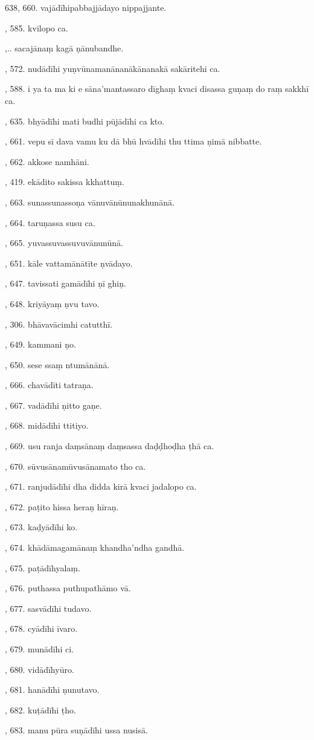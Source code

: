 638, 660. vajādīhipabbajjādayo nippajjante.\par {}, 585. kvilopo ca.\par {},.. sacajānaṃ kagā ṇānubandhe.\par {}, 572. nudādīhi yuṇvūnamanānanākānanakā sakāritehi ca.\par {}, 588. i ya ta ma ki e sāna’mantassaro dīghaṃ kvaci disassa guṇaṃ do raṃ sakkhī ca.\par {}, 635. bhyādīhi mati budhi pūjādīhi ca kto.\par {}, 661. vepu sī dava vamu ku dā bhū hvādīhi thu ttima ṇimā nibbatte.\par {}, 662. akkose namhāni.\par {}, 419. ekādito sakissa kkhattuṃ.\par {}, 663. sunassunassoṇa vānuvānūnunakhunānā.\par {}, 664. taruṇassa susu ca.\par {}, 665. yuvassuvassuvuvānunūnā.\par {}, 651. kāle vattamānātīte ṇvādayo.\par {}, 647. tavissati gamādīhi ṇī ghiṇ.\par {}, 648. kriyāyaṃ ṇvu tavo.\par {}, 306. bhāvavācimhi catutthī.\par {}, 649. kammani ṇo.\par {}, 650. sese ssaṃ ntumānānā.\par {}, 666. chavādīti tatraṇa.\par {}, 667. vadādīhi ṇitto gaṇe.\par {}, 668. midādīhi ttitiyo.\par {}, 669. usu ranja daṃsānaṃ daṃsassa daḍḍhoḍha ṭhā ca.\par {}, 670. sūvusānamūvusānamato tho ca.\par {}, 671. ranjudādīhi dha didda kirā kvaci jadalopo ca.\par {}, 672. paṭito hissa heraṇ hīraṇ.\par {}, 673. kaḍyādīhi ko.\par {}, 674. khādāmagamānaṃ khandha’ndha gandhā.\par {}, 675. paṭādīhyalaṃ.\par {}, 676. puthassa puthupathāmo vā.\par {}, 677. sasvādīhi tudavo.\par {}, 678. cyādīhi īvaro.\par {}, 679. munādīhi ci.\par {}, 680. vidādīhyūro.\par {}, 681. hanādīhi ṇunutavo.\par {}, 682. kuṭādīhi ṭho.\par {}, 683. manu pūra suṇādīhi ussa nusisā.\par \noindent
